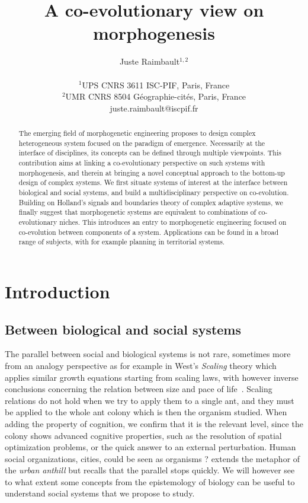 \documentclass[letterpaper]{article}
\title{A co-evolutionary view on morphogenesis}
\author{Juste Raimbault$^{1,2}$\\
\mbox{}\\
$^1$UPS CNRS 3611 ISC-PIF, Paris, France \\
$^2$UMR CNRS 8504 G{\'e}ographie-cit{\'e}s, Paris, France \\
juste.raimbault@iscpif.fr} %
\begin{document}
\maketitle

\begin{abstract}
The emerging field of morphogenetic engineering proposes to design complex heterogeneous system focused on the paradigm of emergence. Necessarily at the interface of disciplines, its concepts can be defined through multiple viewpoints. This contribution aims at linking a co-evolutionary perspective on such systems with morphogenesis, and therein at bringing a novel conceptual approach to the bottom-up design of complex systems. We first situate systems of interest at the interface between biological and social systems, and build a multidisciplinary perspective on co-evolution. Building on Holland's signals and boundaries theory of complex adaptive systems, we finally suggest that morphogenetic systems are equivalent to combinations of co-evolutionary niches. This introduces an entry to morphogenetic engineering focused on co-evolution between components of a system. Applications can be found in a broad range of subjects, with for example planning in territorial systems.
\end{abstract}

\section{Introduction}




\subsection{Between biological and social systems}


The parallel between social and biological systems is not rare, sometimes more from an analogy perspective as for example in West's \emph{Scaling} theory which applies similar growth equations starting from scaling laws, with however inverse conclusions concerning the relation between size and pace of life~\citep{bettencourt2007growth}. Scaling relations do not hold when we try to apply them to a single ant, and they must be applied to the whole ant colony which is then the organism studied. When adding the property of cognition, we confirm that it is the relevant level, since the colony shows advanced cognitive properties, such as the resolution of spatial optimization problems, or the quick answer to an external perturbation. Human social organizations, cities, could be seen as organisms ? \cite{banos2013pour} extends the metaphor of the \emph{urban anthill} but recalls that the parallel stops quickly. We will however see to what extent some concepts from the epistemology of biology can be useful to understand social systems that we propose to study.
\end{document}
